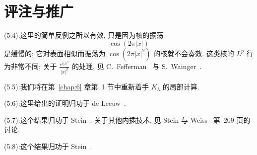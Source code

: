 \section{评注与推广}
\label{sec:5.3}

\noindent (5.4):\quad 这里的简单反例之所以有效, 只是因为核的振荡
\[
\cos(2\pi|x|)
\]
是缓慢的; 它对表面相似而振荡为 $\cos(2\pi|x|^2)$ 的核就不会奏效. 这类核的 $L^p$ 行为非常不同; 关于 $\frac{e^{i|x|^\alpha}}{|x|^\beta}$ 的处理, 见 C.~Fefferman~\cite{fefferman-stronglysingular} 与 S.~Wainger~\cite{wainger-special}.

\noindent (5.5):\quad 我们将在第~\ref{chap:6} 章第~1 节中重新着手 $K_{\lambda}$ 的局部计算.

\noindent (5.6):\quad 这里给出的证明归功于 de Leeuw~\cite{deleeuw}.

\noindent (5.7):\quad 这个结果归功于 Stein~\cite{stein-interpolation}; 关于其他内插技术, 见 Stein 与 Weiss~\cite{steinweiss} 第~209 页的讨论.

\noindent (5.8):\quad 这个结果归功于 Stein~\cite{stein-interpolation}.
